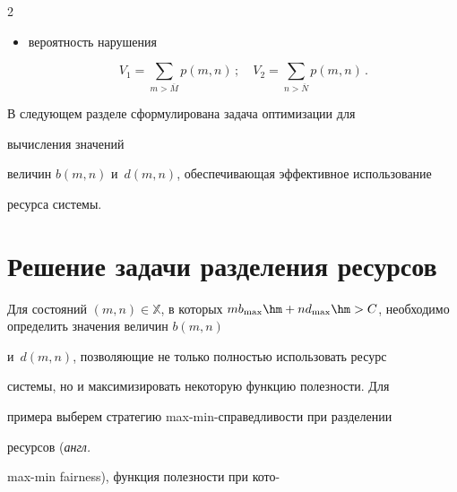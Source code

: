 \begin{multicols}{2}
\begin{itemize}
\begin{multline*}
\hspace*{-15pt}{}={N_2} \!\left(\!\lambda_2(1-B_2^{\mathrm{arr}})- %


\lambda_1 \!\!\!\sum\limits_{(m,n)\in 


\mathbb{B}_2^{\mathrm{arr}}} \!\!\!k(m,n)p(m,n)\!\right)^{\!-1}\!;\hspace*{-9pt}


\end{multline*}


\item вероятность нарушения


$$


V_1=\sum\limits_{m>\overline{M}} p(m,n)\,;\quad 


V_2=\sum\limits_{n>\overline{N}} p(m,n)\,.


$$


  \end{itemize}


  


  В следующем разделе сформулирована задача оптимизации для 


вычисления значений  


величин $b(m,n)$ и~$d(m,n)$, обеспечивающая эффективное использование 


ресурса системы.


  


  \section{Решение задачи разделения ресурсов} %


  


  Для состояний $(m,n)\in \mathbb{X}$, в которых $mb_{\max}\hm+ 


nd_{\max}\hm> C$, необходимо определить значения величин $b(m,n)$ 


и~$d(m,n)$, позволяющие не только полностью использовать ресурс 


системы, но и максимизировать некоторую функцию по\-лез\-ности. Для 


примера выберем стратегию max-min-справедливости при разделении 


ресурсов (\textit{англ.}\  


max-min fairness), функция полезности при кото-\linebreak



\end{multicols}
